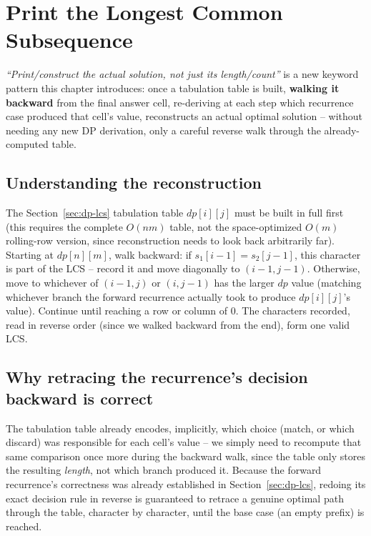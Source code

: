 \section{Print the Longest Common Subsequence}
\label{sec:dp-print-lcs}


\begin{patternbox}
\emph{``Print/construct the actual solution, not just its length/count''}
is a new keyword pattern this chapter introduces: once a tabulation table
is built, \textbf{walking it backward} from the final answer cell,
re-deriving at each step which recurrence case produced that cell's
value, reconstructs an actual optimal solution -- without needing any new
DP derivation, only a careful reverse walk through the already-computed
table.
\end{patternbox}

\subsection*{Understanding the reconstruction}

The Section~\ref{sec:dp-lcs} tabulation table $\textit{dp}[i][j]$ must be
built in full first (this requires the complete $O(nm)$ table, not the
space-optimized $O(m)$ rolling-row version, since reconstruction needs
to look back arbitrarily far). Starting at $\textit{dp}[n][m]$, walk
backward: if $s_1[i-1] = s_2[j-1]$, this character is part of the LCS --
record it and move diagonally to $(i-1,j-1)$. Otherwise, move to
whichever of $(i-1,j)$ or $(i,j-1)$ has the larger $\textit{dp}$ value
(matching whichever branch the forward recurrence actually took to
produce $\textit{dp}[i][j]$'s value). Continue until reaching a row or
column of $0$. The characters recorded, read in reverse order (since we
walked backward from the end), form one valid LCS.

\subsection*{Why retracing the recurrence's decision backward is correct}

The tabulation table already encodes, implicitly, which choice (match,
or which discard) was responsible for each cell's value -- we simply
need to recompute that same comparison once more during the backward
walk, since the table only stores the resulting \emph{length}, not which
branch produced it. Because the forward recurrence's correctness was
already established in Section~\ref{sec:dp-lcs}, redoing its exact
decision rule in reverse is guaranteed to retrace a genuine optimal path
through the table, character by character, until the base case (an
empty prefix) is reached.

